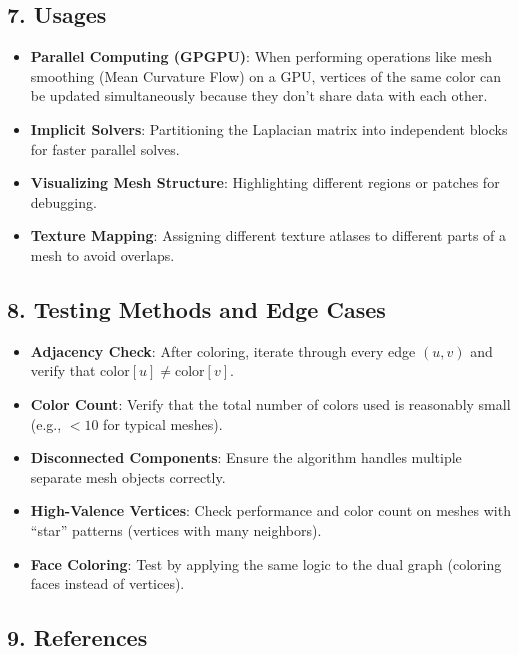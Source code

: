\subsection{7. Usages}

\begin{itemize}
    \item \textbf{Parallel Computing (GPGPU)}: When performing operations like mesh smoothing (Mean Curvature Flow\cite{gage1986,grayson1987}) on a GPU, vertices of the same color can be updated simultaneously because they don't share data with each other.
    \item \textbf{Implicit Solvers}: Partitioning the Laplacian matrix into independent blocks for faster parallel solves.
    \item \textbf{Visualizing Mesh Structure}: Highlighting different regions or patches for debugging.
    \item \textbf{Texture Mapping}: Assigning different texture atlases to different parts of a mesh to avoid overlaps.
\end{itemize}

\subsection{8. Testing Methods and Edge Cases}

\begin{itemize}
    \item \textbf{Adjacency Check}: After coloring, iterate through every edge $(u, v)$ and verify that $\text{color}[u] \neq \text{color}[v]$.
    \item \textbf{Color Count}: Verify that the total number of colors used is reasonably small (e.g., $< 10$ for typical meshes).
    \item \textbf{Disconnected Components}: Ensure the algorithm handles multiple separate mesh objects correctly.
    \item \textbf{High-Valence Vertices}: Check performance and color count on meshes with ``star'' patterns (vertices with many neighbors).
    \item \textbf{Face Coloring}: Test by applying the same logic to the dual graph (coloring faces instead of vertices).
\end{itemize}

\subsection{9. References}

